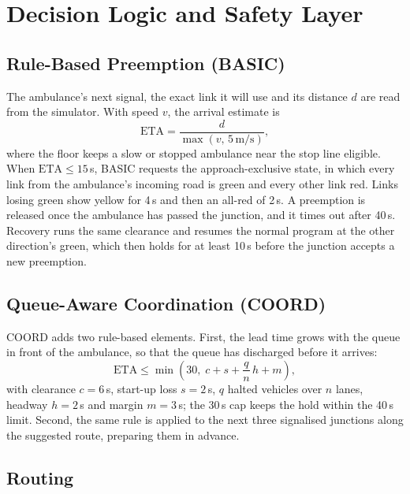 \documentclass[conference]{IEEEtran}
\begin{document}
\section{Decision Logic and Safety Layer}

\subsection{Rule-Based Preemption (BASIC)}

The ambulance's next signal, the exact link it will use and its distance $d$ are read from the simulator. With speed $v$, the arrival estimate is
\begin{equation}
\mathrm{ETA} = \frac{d}{\max(v,\, 5\,\mathrm{m/s})},\label{eq:eta}
\end{equation}
where the floor keeps a slow or stopped ambulance near the stop line eligible. When $\mathrm{ETA}\le 15$\,s, BASIC requests the approach-exclusive state, in which every link from the ambulance's incoming road is green and every other link red. Links losing green show yellow for 4\,s and then an all-red of 2\,s. A preemption is released once the ambulance has passed the junction, and it times out after 40\,s. Recovery runs the same clearance and resumes the normal program at the other direction's green, which then holds for at least 10\,s before the junction accepts a new preemption.

\subsection{Queue-Aware Coordination (COORD)}

COORD adds two rule-based elements. First, the lead time grows with the queue in front of the ambulance, so that the queue has discharged before it arrives:
\begin{equation}
\mathrm{ETA}\le \min\!\left(30,\; c + s + \frac{q}{n}\,h + m\right),\label{eq:lead}
\end{equation}
with clearance $c=6$\,s, start-up loss $s=2$\,s, $q$ halted vehicles over $n$ lanes, headway $h=2$\,s and margin $m=3$\,s; the 30\,s cap keeps the hold within the 40\,s limit. Second, the same rule is applied to the next three signalised junctions along the suggested route, preparing them in advance.

\subsection{Routing}
\end{document}
